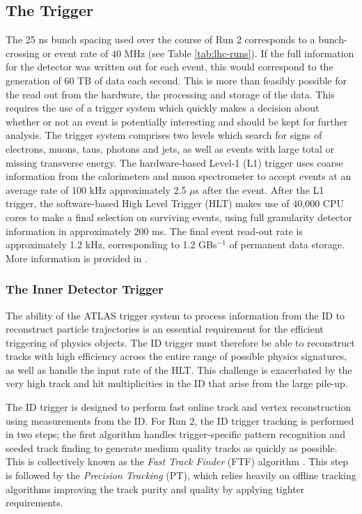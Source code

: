 \subsection{The Trigger}
The 25 ns bunch spacing used over the course of Run 2 corresponds to a bunch-crossing or event rate of 40 MHz (see Table \ref{tab:lhc-runs}). If the full information for the detector was written out for each event, this would correspond to the generation of 60 TB of data each second. This is more than feasibly possible for the read out from the hardware, the processing and storage of the data. This requires the use of a trigger system which quickly makes a decision about whether or not an event is potentially interesting and should be kept for further analysis. The trigger system comprises two levels which search for signs of electrons, muons, taus, photons and jets, as well as events with large total or missing transverse energy. The hardware-based Level-1 (L1) trigger uses coarse information from the calorimeters and muon spectrometer to accept events at an average rate of 100 kHz approximately 2.5 $\mu$s after the event. After the L1 trigger, the software-based High Level Trigger (HLT) makes use of 40,000 CPU cores to make a final selection on surviving events, using full granularity detector information in approximately 200 ms. The final event read-out rate is approximately 1.2 kHz, corresponding to 1.2 GBs$^{-1}$ of permanent data storage. More information is provided in \cite{TRIG-2016-01}.


\subsubsection{The Inner Detector Trigger}

The ability of the ATLAS trigger system to process information from the ID to reconstruct particle trajectories is an essential requirement for the efficient triggering of physics objects. The ID trigger must therefore be able to reconstruct tracks with high efficiency across the entire range of possible physics signatures, as well as handle the input rate of the HLT. This challenge is exacerbated by the very high track and hit multiplicities in the ID that arise from the large pile-up. 

The ID trigger is designed to perform fast online track and vertex reconstruction using measurements from the ID. For Run 2, the ID trigger tracking is performed in two steps; the first algorithm handles trigger-specific pattern recognition and seeded track finding to generate medium quality tracks as quickly as possible. This is collectively known as the \textit{Fast Track Finder} (FTF) algorithm \cite{Penc:2104217, Grandi:2624768}. This step is followed by the \textit{Precision Tracking} (PT), which relies heavily on offline tracking algorithms \cite{T_Cornelissen_2008} improving the track purity and quality by applying tighter requirements. 



